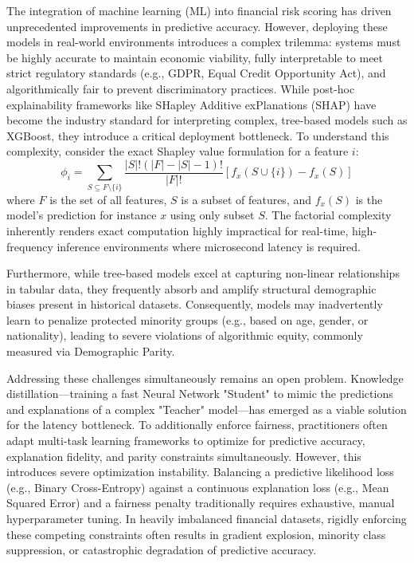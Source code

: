 \documentclass{wscpaperproc}
\theoremstyle{wsc}
\begin{document}
The integration of machine learning (ML) into financial risk scoring has driven unprecedented improvements in predictive accuracy. However, deploying these models in real-world environments introduces a complex trilemma: systems must be highly accurate to maintain economic viability, fully interpretable to meet strict regulatory standards (e.g., GDPR, Equal Credit Opportunity Act), and algorithmically fair to prevent discriminatory practices. While post-hoc explainability frameworks like SHapley Additive exPlanations (SHAP) have become the industry standard for interpreting complex, tree-based models such as XGBoost, they introduce a critical deployment bottleneck. To understand this complexity, consider the exact Shapley value formulation for a feature $i$:
\begin{equation*} \label{eq:shap}
    \phi_{i} = \sum_{S \subseteq F \setminus \{i\}} \frac{|S|!(|F| - |S| - 1)!}{|F|!} \left[ f_{x}(S \cup \{i\}) - f_{x}(S) \right]
\end{equation*}
where $F$ is the set of all features, $S$ is a subset of features, and $f_{x}(S)$ is the model's prediction for instance $x$ using only subset $S$. The factorial complexity inherently renders exact computation highly impractical for real-time, high-frequency inference environments where microsecond latency is required.

Furthermore, while tree-based models excel at capturing non-linear relationships in tabular data, they frequently absorb and amplify structural demographic biases present in historical datasets. Consequently, models may inadvertently learn to penalize protected minority groups (e.g., based on age, gender, or nationality), leading to severe violations of algorithmic equity, commonly measured via Demographic Parity.

Addressing these challenges simultaneously remains an open problem. Knowledge distillation—training a fast Neural Network "Student" to mimic the predictions and explanations of a complex "Teacher" model—has emerged as a viable solution for the latency bottleneck. To additionally enforce fairness, practitioners often adapt multi-task learning frameworks to optimize for predictive accuracy, explanation fidelity, and parity constraints simultaneously. However, this introduces severe optimization instability. Balancing a predictive likelihood loss (e.g., Binary Cross-Entropy) against a continuous explanation loss (e.g., Mean Squared Error) and a fairness penalty traditionally requires exhaustive, manual hyperparameter tuning. In heavily imbalanced financial datasets, rigidly enforcing these competing constraints often results in gradient explosion, minority class suppression, or catastrophic degradation of predictive accuracy.
\end{document}
